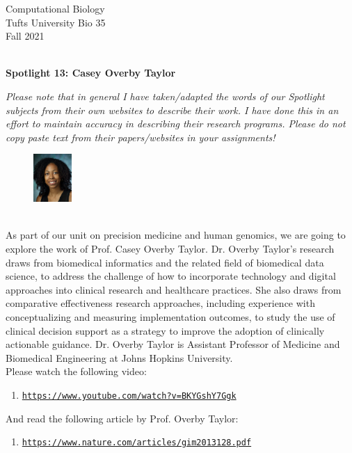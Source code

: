 \documentclass{article}
\begin{document}
\BeginAccSupp{}
\begin{flushright}
Computational Biology ~\\
Tufts University Bio 35 ~\\
Fall 2021 ~\\ ~\\
\end{flushright}
\begin{center}{\textbf{\Large{Spotlight 13: Casey Overby Taylor}}}\end{center}

\textit{Please note that in general I have taken/adapted the words of our Spotlight subjects from their own websites to describe their work. I have done this in an effort to maintain accuracy in describing their research programs. Please do not copy paste text from their papers/websites in your assignments!}

\begin{figure}
\begin{center}
 \includegraphics[width=0.13\textwidth]{images/overby-taylor.jpeg}
 \end{center}
\end{figure}
~\\ As part of our unit on precision medicine and human genomics, we are going to explore the work of Prof. Casey Overby Taylor. Dr. Overby Taylor's research draws from biomedical informatics and the related field of biomedical data science, to address the challenge of how to incorporate technology and digital approaches into clinical research and healthcare practices. She also draws from comparative effectiveness research approaches, including experience with conceptualizing and measuring implementation outcomes, to study the use of clinical decision support as a strategy to improve the adoption of clinically actionable guidance. Dr. Overby Taylor is Assistant Professor of Medicine and Biomedical Engineering at Johns Hopkins University. 
~\\

Please watch the following video:
\begin{enumerate}
\item \texttt{\href{https://www.youtube.com/watch?v=BKYGshY7Ggk}{https://www.youtube.com/watch?v=BKYGshY7Ggk}}
\end{enumerate}
And read the following article by Prof. Overby Taylor: 
\begin{enumerate}
\item \texttt{\href{https://www.nature.com/articles/gim2013128.pdf}{https://www.nature.com/articles/gim2013128.pdf}}
\end{enumerate}
\end{document}
